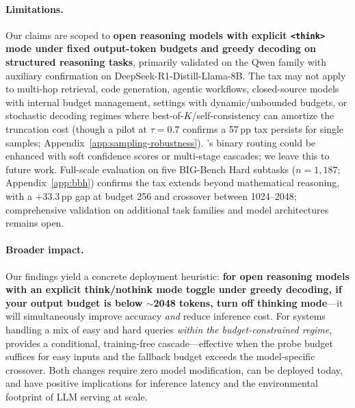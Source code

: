\paragraph{Limitations.}
Our claims are scoped to \textbf{open reasoning models with explicit \texttt{<think>} mode under fixed output-token budgets and greedy decoding on structured reasoning tasks}, primarily validated on the Qwen family with auxiliary confirmation on DeepSeek-R1-Distill-Llama-8B.
The tax may not apply to multi-hop retrieval, code generation, agentic workflows, closed-source models with internal budget management, settings with dynamic/unbounded budgets, or stochastic decoding regimes where best-of-$K$/self-consistency can amortize the truncation cost (though a pilot at $\tau{=}0.7$ confirms a 57\,pp tax persists for single samples; Appendix~\ref{app:sampling-robustness}).
\method{}'s binary routing could be enhanced with soft confidence scores or multi-stage cascades; we leave this to future work.
Full-scale evaluation on five BIG-Bench Hard subtasks ($n{=}1{,}187$; Appendix~\ref{app:bbh}) confirms the tax extends beyond mathematical reasoning, with a +33.3\,pp gap at budget 256 and crossover between 1024--2048; comprehensive validation on additional task families and model architectures remains open.

\paragraph{Broader impact.}
Our findings yield a concrete deployment heuristic: \textbf{for open reasoning models with an explicit think/nothink mode toggle under greedy decoding, if your output budget is below ${\sim}$2048 tokens, turn off thinking mode}---it will simultaneously improve accuracy \emph{and} reduce inference cost.
For systems handling a mix of easy and hard queries \emph{within the budget-constrained regime}, \method{} provides a conditional, training-free cascade---effective when the probe budget suffices for easy inputs and the fallback budget exceeds the model-specific crossover.
Both changes require zero model modification, can be deployed today, and have positive implications for inference latency and the environmental footprint of LLM serving at scale.
